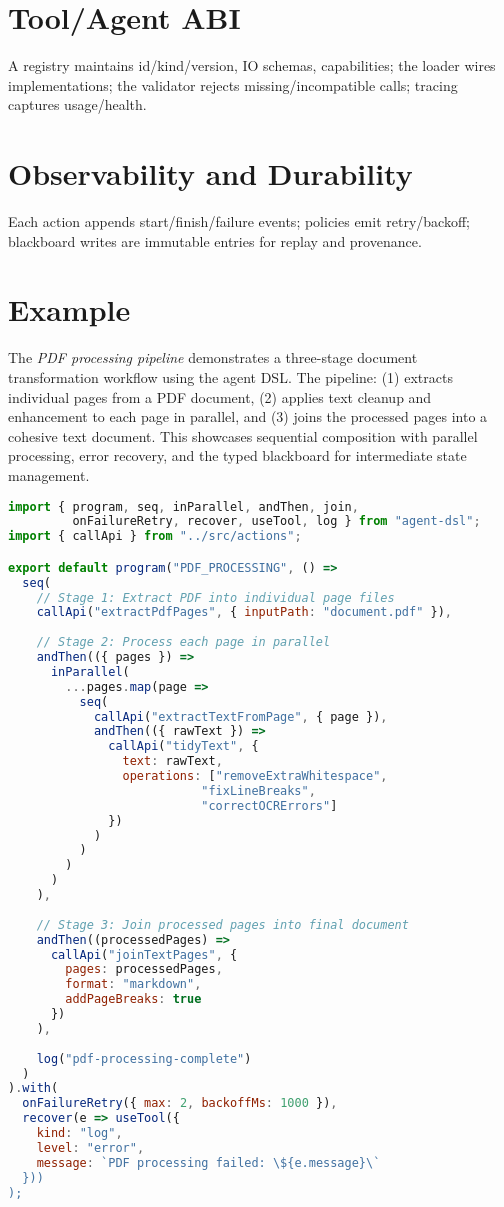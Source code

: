 \documentclass[11pt,a4paper]{article}
\begin{document}
\section{Tool/Agent ABI}
A registry maintains id/kind/version, IO schemas, capabilities; the loader wires implementations; the validator rejects missing/incompatible calls; tracing captures usage/health.
\section{Observability and Durability}
Each action appends start/finish/failure events; policies emit retry/backoff; blackboard writes are immutable entries for replay and provenance.
\section{Example}
The \emph{PDF processing pipeline} demonstrates a three-stage document transformation workflow using the agent DSL. The pipeline: (1) extracts individual pages from a PDF document, (2) applies text cleanup and enhancement to each page in parallel, and (3) joins the processed pages into a cohesive text document. This showcases sequential composition with parallel processing, error recovery, and the typed blackboard for intermediate state management.

\begin{lstlisting}[language=JavaScript, basicstyle=\ttfamily\small, frame=single]
import { program, seq, inParallel, andThen, join, 
         onFailureRetry, recover, useTool, log } from "agent-dsl";
import { callApi } from "../src/actions";

export default program("PDF_PROCESSING", () =>
  seq(
    // Stage 1: Extract PDF into individual page files
    callApi("extractPdfPages", { inputPath: "document.pdf" }),
    
    // Stage 2: Process each page in parallel
    andThen(({ pages }) => 
      inParallel(
        ...pages.map(page => 
          seq(
            callApi("extractTextFromPage", { page }),
            andThen(({ rawText }) => 
              callApi("tidyText", { 
                text: rawText,
                operations: ["removeExtraWhitespace", 
                           "fixLineBreaks", 
                           "correctOCRErrors"]
              })
            )
          )
        )
      )
    ),
    
    // Stage 3: Join processed pages into final document
    andThen((processedPages) => 
      callApi("joinTextPages", { 
        pages: processedPages,
        format: "markdown",
        addPageBreaks: true
      })
    ),
    
    log("pdf-processing-complete")
  )
).with(
  onFailureRetry({ max: 2, backoffMs: 1000 }),
  recover(e => useTool({ 
    kind: "log", 
    level: "error", 
    message: `PDF processing failed: \${e.message}\` 
  }))
);
\end{lstlisting}
\end{document}
